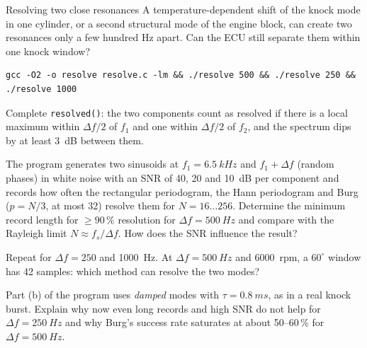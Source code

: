 \begin{exercise}{Resolving two close resonances}{\JSLinux}
\sloppy
A temperature-dependent shift of the knock mode in one cylinder, or a second structural
mode of the engine block, can create two resonances only a few hundred Hz apart. Can
the ECU still separate them within one knock window?
\begin{lstlisting}[style=shell]
gcc -O2 -o resolve resolve.c -lm && ./resolve 500 && ./resolve 250 && ./resolve 1000
\end{lstlisting}
\begin{tasks}
  \item Complete \texttt{resolved()}: the two components count as resolved if there is a
    local maximum within $\Delta f/2$ of $f_1$ and one within $\Delta f/2$ of $f_2$, and
    the spectrum dips by at least \SI{3}{dB} between them.
  \item The program generates two sinusoids at $f_1=\SI{6.5}{kHz}$ and $f_1+\Delta f$
    (random phases) in white noise with an SNR of 40, 20 and \SI{10}{dB} per component
    and records how often the rectangular periodogram, the Hann periodogram and Burg
    ($p=N/3$, at most 32) resolve them for $N=16\dots256$. Determine the minimum record
    length for $\ge90\,\%$ resolution for $\Delta f=\SI{500}{Hz}$ and compare with the
    Rayleigh limit $N\approx f_s/\Delta f$. How does the SNR influence the result?
  \item Repeat for $\Delta f=250$ and \SI{1000}{Hz}. At $\Delta f=\SI{500}{Hz}$ and
    \SI{6000}{rpm}, a $60^\circ$ window has 42 samples: which method can resolve the two
    modes?
  \item Part (b) of the program uses \emph{damped} modes with $\tau=\SI{0.8}{ms}$, as in a
    real knock burst. Explain why now even long records and high SNR do not help for
    $\Delta f=\SI{250}{Hz}$ and why Burg's success rate saturates at about 50--60\,\% for
    $\Delta f=\SI{500}{Hz}$.
\end{tasks}
\end{exercise}

